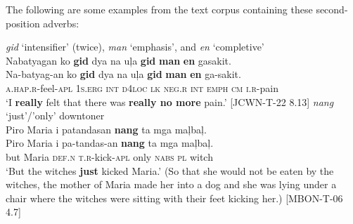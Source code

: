 \z

The following are some examples from the text corpus containing these second-position adverbs:

\ea
\textit{gid} ‘intensifier’ (twice), \textit{man} ‘emphasis’, and \textit{en} ‘completive’ \\
Nabatyagan  ko  \textbf{gid}  dya  na  uļa  \textbf{gid}  \textbf{man}  \textbf{en}  gasakit. \\\smallskip
 \gll Na-batyag-an  ko  \textbf{gid}  dya  na  uļa  \textbf{gid}  \textbf{man}  \textbf{en}  ga-sakit. \\
\textsc{a.hap.r}-feel-\textsc{apl}  1\textsc{s.erg}  \textsc{int}  \textsc{d}4\textsc{loc}  \textsc{lk}  \textsc{neg.r}  \textsc{int}  \textsc{emph}  \textsc{cm}  \textsc{i.r}-pain \\
\glt ‘I \textbf{really} felt that there was \textbf{really no more} pain.' [JCWN-T-22 8.13]
\z
\ea
\textit{nang} ‘just’/’only’ downtoner \\
Piro Maria  i  patandasan  \textbf{nang}  ta  mga  maļbaļ. \\\smallskip
 \gll Piro Maria  i  pa-tandas-an  \textbf{nang}  ta  mga  maļbaļ. \\
but  Maria  \textsc{def.n}  \textsc{t.r}-kick-\textsc{apl}  only  \textsc{nabs}  \textsc{pl}  witch \\
\glt ‘But the witches \textbf{just} kicked Maria.’ (So that she would not be eaten by the witches, the mother of Maria made her into a dog and she was lying under a chair where the witches were sitting with their feet kicking her.) [MBON-T-06 4.7] 
\z



